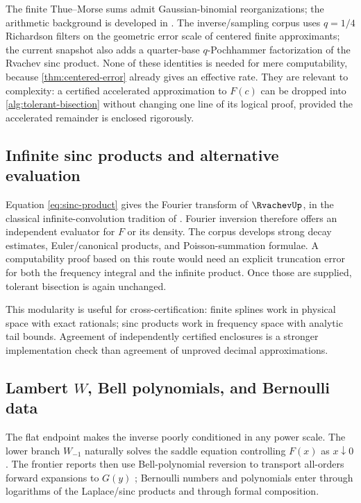 \documentclass[11pt,oneside]{article}
\theoremstyle{definition}
\theoremstyle{remark}
\numberwithin{equation}{section}
\begin{document}
The finite Thue--Morse sums admit Gaussian-binomial reorganizations; the
arithmetic background is developed in \cite{Arias06487,ProveIt}.  The
inverse/sampling corpus uses $q=1/4$ Richardson filters on the geometric error
scale of centered finite approximants; the current snapshot also adds a
quarter-base $q$-Pochhammer factorization of the Rvachev sinc product.  None of
these identities is needed for mere computability, because
\cref{thm:centered-error} already gives an effective rate.  They are relevant
to complexity: a certified accelerated approximation to $F(c)$ can be dropped
into \cref{alg:tolerant-bisection} without changing one line of its logical
proof, provided the accelerated remainder is enclosed rigorously.

\subsection{Infinite sinc products and alternative evaluation}

Equation \eqref{eq:sinc-product} gives the Fourier transform of $\RvachevUp$, in
the classical infinite-convolution tradition of
\cite{JessenWintner1935,Arias05442}.  Fourier inversion therefore offers an independent evaluator for $F$ or its density.
The corpus develops strong decay estimates, Euler/canonical products, and
Poisson-summation formulae.  A computability proof based on this route would
need an explicit truncation error for both the frequency integral and the
infinite product.  Once those are supplied, tolerant bisection is again
unchanged.

This modularity is useful for cross-certification: finite splines work in
physical space with exact rationals; sinc products work in frequency space
with analytic tail bounds.  Agreement of independently certified enclosures
is a stronger implementation check than agreement of unproved decimal
approximations.

\subsection{Lambert \texorpdfstring{$W$}{W}, Bell polynomials, and Bernoulli data}

The flat endpoint makes the inverse poorly conditioned in any power scale.
The lower branch $W_{-1}$ naturally solves the saddle equation controlling
$F(x)$ as $x\downarrow0$.  The frontier reports then use Bell-polynomial
reversion to transport all-orders forward expansions to $G(y)$ \cite{ProveIt}; Bernoulli numbers and
polynomials enter through logarithms of the Laplace/sinc products and through
formal composition.
\end{document}
